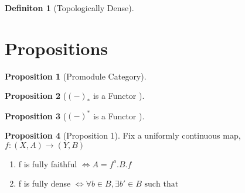 \documentclass[18pt,a4paper]{article}
\theoremstyle{definition}
\newtheorem{definition}{Definiton}[section]
\newtheorem{proop}{Proposition}[section]
\begin{document}

\begin{definition}[Topologically Dense] %

\end{definition}

\section{Propositions}

\begin{proop}[Promodule Category]

\end{proop}
\begin{proop}[$(-)_*$ is a Functor ]

\end{proop}

\begin{proop}[$(-)^*$ is a Functor ]

\end{proop}


\begin{proop}[Proposition 1]
	Fix a uniformly continuous map, $f:(X,A) \rightarrow (Y,B)$
	\begin{enumerate}[label=(\alph*)]
		\item f is fully faithful $\iff A=f^o.B.f$
		\item f is fully dense $\iff \forall b\in B, \exists b' \in B \text{ such that }  $
	\end{enumerate}
\end{proop}
\end{document}
